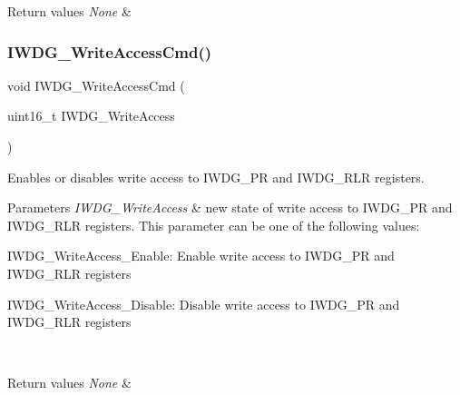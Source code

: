 \begin{DoxyRetVals}{Return values}
{\em None} & \\
\hline
\end{DoxyRetVals}
\mbox{\label{group___i_w_d_g___private___functions_gae466681e5bdc11b353c508b89d75ca05}} 
\subsubsection{\texorpdfstring{IWDG\_WriteAccessCmd()}{IWDG\_WriteAccessCmd()}}
{\footnotesize\ttfamily void I\+W\+D\+G\+\_\+\+Write\+Access\+Cmd (\begin{DoxyParamCaption}\item[{uint16\+\_\+t}]{I\+W\+D\+G\+\_\+\+Write\+Access }\end{DoxyParamCaption})}



Enables or disables write access to I\+W\+D\+G\+\_\+\+PR and I\+W\+D\+G\+\_\+\+R\+LR registers. 


\begin{DoxyParams}{Parameters}
{\em I\+W\+D\+G\+\_\+\+Write\+Access} & new state of write access to I\+W\+D\+G\+\_\+\+PR and I\+W\+D\+G\+\_\+\+R\+LR registers. This parameter can be one of the following values\+: \begin{DoxyItemize}
\item I\+W\+D\+G\+\_\+\+Write\+Access\+\_\+\+Enable\+: Enable write access to I\+W\+D\+G\+\_\+\+PR and I\+W\+D\+G\+\_\+\+R\+LR registers \item I\+W\+D\+G\+\_\+\+Write\+Access\+\_\+\+Disable\+: Disable write access to I\+W\+D\+G\+\_\+\+PR and I\+W\+D\+G\+\_\+\+R\+LR registers \end{DoxyItemize}
\\
\hline
\end{DoxyParams}

\begin{DoxyRetVals}{Return values}
{\em None} & \\
\hline
\end{DoxyRetVals}
